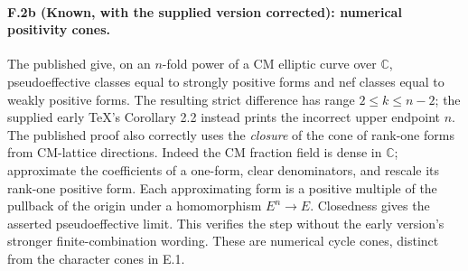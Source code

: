 \paragraph{F.2b (Known, with the supplied version corrected): numerical positivity cones.}
The published \citet[Theorem 2.1 and Corollary 2.2,
pp.~1799--1801]{rootDELV2011} give, on an $n$-fold power of a
CM elliptic curve over $\mathbb C$, pseudoeffective classes equal to strongly
positive forms and nef classes equal to weakly positive forms.
The resulting strict difference has range $2\le k\le n-2$;
the supplied early TeX's Corollary 2.2 instead prints the
incorrect upper endpoint $n$. The published proof also correctly
uses the \emph{closure} of the cone of rank-one forms from
CM-lattice directions. Indeed the CM fraction field is dense
in $\mathbb C$; approximate the coefficients of a one-form,
clear denominators, and rescale its rank-one positive form.
Each approximating form is a positive multiple of the pullback
of the origin under a homomorphism $E^n\to E$.
Closedness gives the asserted pseudoeffective limit.
This verifies the step without the early version's stronger
finite-combination wording. These are numerical cycle cones,
distinct from the character cones in E.1.
